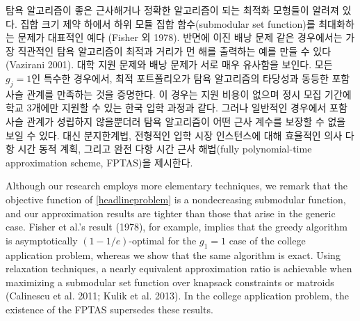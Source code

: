 \documentclass[11pt]{article} %
\newif\ifen
\theoremstyle{definition}
\theoremstyle{definition}
\begin{document}
\ifen
For certain classes of optimization problems, such as maximizing a submodular set function over a cardinality constraint, a greedy algorithm is known to be a good approximate solution and exact under certain additional assumptions (Fisher et al. 1978). For other problems, notably the binary knapsack problem, the most intuitive greedy algorithm can be made to perform arbitrarily poorly (Vazirani 2001). We show results for the college application problem that mirror those for knapsack: In the special case where each $g_j = 1$, the optimal portfolio satisfy a nestedness property that is equivalent to the validity of the greedy algorithm. This case mirrors the centralized college application process in Korea, where there is no application fee, but students are allowed to apply to only three schools during the main admissions cycle. Unfortunately, the nestedness property does not hold in the general case, nor does the greedy algorithm offer any performance guarantee. Instead, we offer a branch-and-bound routine, a pseudopolynomial-time algorithm that is tractable for typical college market instances, and a fully polynomial-time approximation scheme (FPTAS).
\else
탐욕 알고리즘이 좋은 근사해거나 정확한 알고리즘이 되는 최적화 모형들이 알려져 있다. 집합 크기 제약 하에서 하위 모듈 집합 함수(submodular set function)를 최대화하는 문제가 대표적인 예다 (Fisher 외 1978). 반면에 이진 배낭 문제 같은 경우에서는 가장 직관적인 탐욕 알고리즘이 최적과 거리가 먼 해를 출력하는 예를 만들 수 있다 (Vazirani 2001). 대학 지원 문제와 배낭 문제가 서로 매우 유사함을 보인다. 모든 $g_j=1$인 특수한 경우에서, 최적 포트폴리오가 탐욕 알고리즘의 타당성과 동등한 포함 사슬 관계를 만족하는 것을 증명한다. 이 경우는 지원 비용이 없으며 정시 모집 기간에 학교 3개에만 지원할 수 있는 한국 입학 과정과 같다. 그러나 일반적인 경우에서 포함 사슬 관계가 성립하지 않을뿐더러 탐욕 알고리즘이 어떤 근사 계수를 보장할 수 없을 보일 수 있다. 대신 분지한계법, 전형적인 입학 시장 인스턴스에 대해 효율적인 의사 다항 시간 동적 계획, 그리고 완전 다항 시간 근사 해법(fully polynomial-time approximation scheme, FPTAS)을 제시한다.
\fi

Although our research employs more elementary techniques, we remark that the objective function of \ref{headlineproblem} is a nondecreasing submodular function, and our approximation results are tighter than those that arise in the generic case. Fisher et al.'s result (1978), for example, implies that the greedy algorithm is asymptotically $(1 - 1/e)$-optimal for the $g_1 = 1$ case of the college application problem, whereas we show that the same algorithm is exact. Using relaxation techniques, a nearly equivalent approximation ratio is achievable when maximizing a submodular set function over knapsack constraints or matroids (Calinescu et al. 2011; Kulik et al. 2013). In the college application problem, the existence of the FPTAS supersedes these results.
\end{document}
